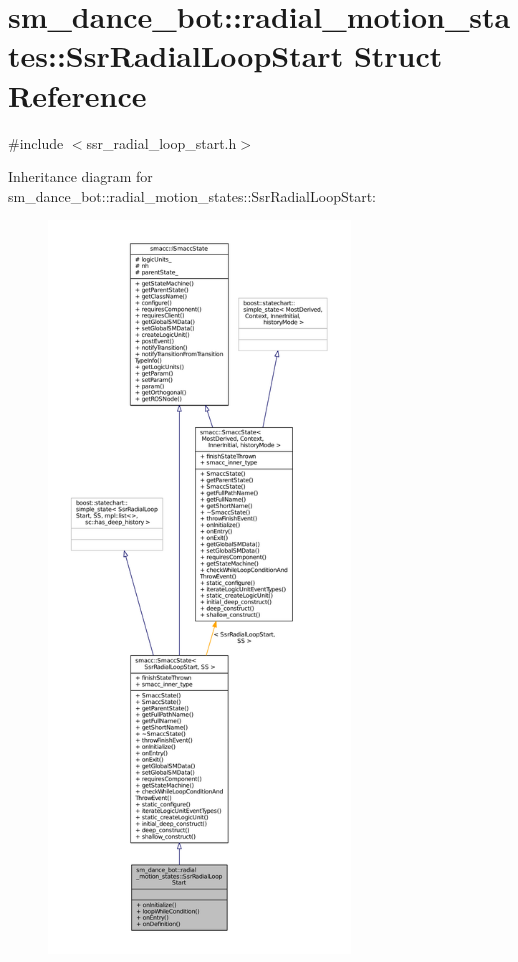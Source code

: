 \hypertarget{structsm__dance__bot_1_1radial__motion__states_1_1SsrRadialLoopStart}{}\section{sm\+\_\+dance\+\_\+bot\+:\+:radial\+\_\+motion\+\_\+states\+:\+:Ssr\+Radial\+Loop\+Start Struct Reference}
\label{structsm__dance__bot_1_1radial__motion__states_1_1SsrRadialLoopStart}


{\ttfamily \#include $<$ssr\+\_\+radial\+\_\+loop\+\_\+start.\+h$>$}



Inheritance diagram for sm\+\_\+dance\+\_\+bot\+:\+:radial\+\_\+motion\+\_\+states\+:\+:Ssr\+Radial\+Loop\+Start\+:
\nopagebreak
\begin{figure}[H]
\begin{center}
\leavevmode
\includegraphics[height=550pt]{structsm__dance__bot_1_1radial__motion__states_1_1SsrRadialLoopStart__inherit__graph}
\end{center}
\end{figure}


